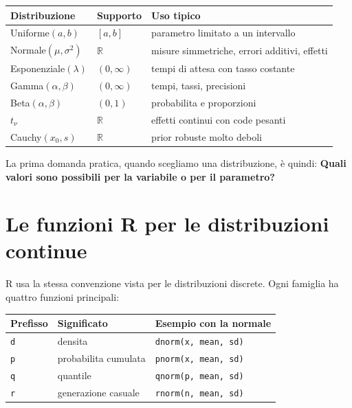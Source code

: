\documentclass[
  italian,
  letterpaper,
  a4paper,
  11pt,
  open=any]{scrbook}
\newcounter{none} %
\theoremstyle{plain}
\theoremstyle{definition}
\theoremstyle{definition}
\theoremstyle{remark}
\begin{document}
{\def\LTcaptype{none} %
\begin{longtable}[]{@{}
  >{\raggedright\arraybackslash}p{}
  >{\raggedleft\arraybackslash}p{}
  >{\raggedright\arraybackslash}p{}@{}}
\toprule\noalign{}
\begin{minipage}[b]{\linewidth}\raggedright
Distribuzione
\end{minipage} & \begin{minipage}[b]{\linewidth}\raggedleft
Supporto
\end{minipage} & \begin{minipage}[b]{\linewidth}\raggedright
Uso tipico
\end{minipage} \\
\midrule\noalign{}
\endhead
\bottomrule\noalign{}
\endlastfoot
Uniforme\((a,b)\) & \([a,b]\) & parametro limitato a un intervallo \\
Normale\((\mu,\sigma^2)\) & \(\mathbb{R}\) & misure simmetriche, errori
additivi, effetti \\
Esponenziale\((\lambda)\) & \((0,\infty)\) & tempi di attesa con tasso
costante \\
Gamma\((\alpha,\beta)\) & \((0,\infty)\) & tempi, tassi, precisioni \\
Beta\((\alpha,\beta)\) & \((0,1)\) & probabilita e proporzioni \\
\(t_\nu\) & \(\mathbb{R}\) & effetti continui con code pesanti \\
Cauchy\((x_0,s)\) & \(\mathbb{R}\) & prior robuste molto deboli \\
\end{longtable}
}

La prima domanda pratica, quando scegliamo una distribuzione, è quindi:
\textbf{Quali valori sono possibili per la variabile o per il
parametro?}

\section{Le funzioni R per le distribuzioni
continue}\label{sec-r-continuous-functions}

R usa la stessa convenzione vista per le distribuzioni discrete. Ogni
famiglia ha quattro funzioni principali:

{\def\LTcaptype{none} %
\begin{longtable}[]{@{}lll@{}}
\toprule\noalign{}
Prefisso & Significato & Esempio con la normale \\
\midrule\noalign{}
\endhead
\bottomrule\noalign{}
\endlastfoot
\texttt{d} & densita & \texttt{dnorm(x,\ mean,\ sd)} \\
\texttt{p} & probabilita cumulata & \texttt{pnorm(x,\ mean,\ sd)} \\
\texttt{q} & quantile & \texttt{qnorm(p,\ mean,\ sd)} \\
\texttt{r} & generazione casuale & \texttt{rnorm(n,\ mean,\ sd)} \\
\end{longtable}
}
\end{document}
